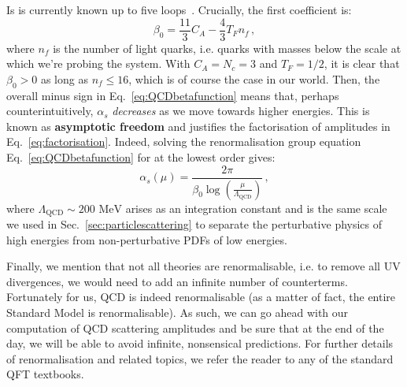 \documentclass[main.tex]{subfiles}
\begin{document}
Is is currently known up to five loops~\cite{Baikov:2016tgj}. Crucially, the first coefficient is:
\begin{equation}
    \beta_0 = \frac{11}{3} C_A - \frac{4}{3} T_F n_f\,,
\end{equation}
where $n_f$ is the number of light quarks, i.e. quarks with masses below the scale at which we're probing the system. With $C_A = N_c = 3$ and $T_F = 1/2$, it is clear that $\beta_0>0$ as long as $n_f\le 16$, which is of course the case in our world. Then, the overall minus sign in Eq.~\ref{eq:QCDbetafunction} means that, perhaps counterintuitively, $\alpha_s$ \textit{decreases} as we move towards higher energies. This is known as \textbf{asymptotic freedom} and justifies the factorisation of amplitudes in Eq.~\ref{eq:factorisation}. Indeed, solving the renormalisation group equation Eq.~\ref{eq:QCDbetafunction} for at the lowest order gives:
\begin{equation}
    \alpha_s(\mu) = \frac{2\pi}{\beta_0 \log \left(\frac{\mu}{\Lambda_\text{QCD}}\right)}\,,
\end{equation}
where $\Lambda_\text{QCD} \sim 200\text{ MeV}$ arises as an integration constant and is the same scale we used in Sec.~\ref{sec:particlescattering} to separate the perturbative physics of high energies from non-perturbative PDFs of low energies. 

Finally, we mention that not all theories are renormalisable, i.e. to remove all UV divergences, we would need to add an infinite number of counterterms. Fortunately for us, QCD is indeed renormalisable (as a matter of fact, the entire Standard Model is renormalisable). As such, we can go ahead with our computation of QCD scattering amplitudes and be sure that at the end of the day, we will be able to avoid infinite, nonsensical predictions. For further details of renormalisation and related topics, we refer the reader to any of the standard QFT textbooks.
\end{document}
